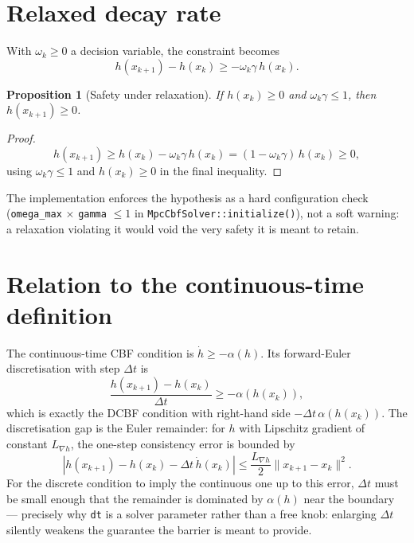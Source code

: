 \documentclass[11pt]{article}
\newtheorem{proposition}{Proposition}
\begin{document}
\section{Relaxed decay rate}
With $\omega_k \ge 0$ a decision variable, the constraint becomes
\[
h(x_{k+1}) - h(x_k) \ge -\omega_k \gamma\, h(x_k).
\]
\begin{proposition}[Safety under relaxation]\label{prop:relaxed}
If $h(x_k) \ge 0$ and $\omega_k \gamma \le 1$, then $h(x_{k+1}) \ge 0$.
\end{proposition}
\begin{proof}
\[
h(x_{k+1}) \ge h(x_k) - \omega_k \gamma\, h(x_k) = (1 - \omega_k \gamma)\, h(x_k) \ge 0,
\]
using $\omega_k \gamma \le 1$ and $h(x_k) \ge 0$ in the final inequality.
\end{proof}
The implementation enforces the hypothesis as a hard configuration check
(\texttt{omega\_max} $\times$ \texttt{gamma} $\le 1$ in \texttt{MpcCbfSolver::initialize()}),
not a soft warning: a relaxation violating it would void the very safety it is meant to retain.

\section{Relation to the continuous-time definition}
The continuous-time CBF condition is $\dot h \ge -\alpha(h)$. Its forward-Euler discretisation
with step $\Delta t$ is
\[
\frac{h(x_{k+1}) - h(x_k)}{\Delta t} \ge -\alpha(h(x_k)),
\]
which is exactly the DCBF condition with right-hand side $-\Delta t\, \alpha(h(x_k))$. The
discretisation gap is the Euler remainder: for $h$ with Lipschitz gradient of constant
$L_{\nabla h}$, the one-step consistency error is bounded by
\[
\left| h(x_{k+1}) - h(x_k) - \Delta t\, \dot h(x_k) \right|
\le \frac{L_{\nabla h}}{2} \|x_{k+1} - x_k\|^2 .
\]
For the discrete condition to imply the continuous one up to this error, $\Delta t$ must be small
enough that the remainder is dominated by $\alpha(h)$ near the boundary --- precisely why
\texttt{dt} is a solver parameter rather than a free knob: enlarging $\Delta t$ silently weakens
the guarantee the barrier is meant to provide.
\end{document}
